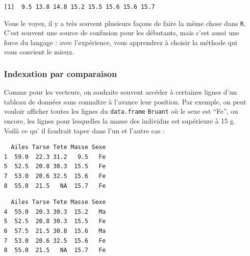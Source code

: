 \documentclass[
  a4paper,
  DIV=11,
  numbers=noendperiod,
  oneside]{scrreprt}
\newenvironment{Shaded}{}{}
\newcommand{\CommentTok}[1]{\textcolor[rgb]{0.42,0.45,0.49}{#1}}
\newcommand{\DecValTok}[1]{\textcolor[rgb]{0.00,0.36,0.77}{#1}}
\newcommand{\NormalTok}[1]{\textcolor[rgb]{0.14,0.16,0.18}{#1}}
\newcommand{\SpecialCharTok}[1]{\textcolor[rgb]{0.00,0.36,0.77}{#1}}
\newcommand{\StringTok}[1]{\textcolor[rgb]{0.01,0.18,0.38}{#1}}
\begin{document}
\begin{verbatim}
[1]  9.5 13.8 14.8 15.2 15.5 15.6 15.6 15.7
\end{verbatim}

Vous le voyez, il y a très souvent plusieurs façons de faire la même
chose dans \texttt{R}. C'est souvent une source de confusion pour les
débutants, mais c'est aussi une force du langage : avec l'expérience,
vous apprendrez à choisir la méthode qui vous convient le mieux.

\subsubsection{Indexation par
comparaison}\label{indexation-par-comparaison}

Comme pour les vecteurs, on souhaite souvent accéder à certaines lignes
d'un tableau de données sans connaître à l'avance leur position. Par
exemple, on peut vouloir afficher toutes les lignes du
\texttt{data.frame} \texttt{Bruant} où le sexe est ``Fe'', ou encore,
les lignes pour lesquelles la masse des individus est supérieure à 15 g.
Voilà ce qu' il faudrait taper dans l'un et l'autre cas :

\begin{Shaded}
\end{Shaded}

\begin{verbatim}
  Ailes Tarse Tete Masse Sexe
1  59.0  22.3 31.2   9.5   Fe
5  52.5  20.8 30.3  15.5   Fe
7  53.0  20.6 32.5  15.6   Fe
8  55.0  21.5   NA  15.7   Fe
\end{verbatim}

\begin{Shaded}
\end{Shaded}

\begin{verbatim}
  Ailes Tarse Tete Masse Sexe
4  55.0  20.3 30.3  15.2   Ma
5  52.5  20.8 30.3  15.5   Fe
6  57.5  21.5 30.8  15.6   Ma
7  53.0  20.6 32.5  15.6   Fe
8  55.0  21.5   NA  15.7   Fe
\end{verbatim}
\end{document}
